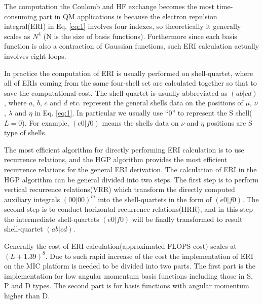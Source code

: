 \documentclass[num-refs]{wiley-article}
\begin{document}
The computation the Coulomb and HF exchange becomes the most time-consuming
part in QM applications is because the electron repulsion integral(ERI) in Eq.
\ref{eq:1} involves four indexes, so theoretically it generally scales as
$N^{4}$ (N is the size of basis functions).  Furthermore since each basis
function is also a contraction of Gaussian functions, such ERI calculation
actually involves eight loops. 

In practice the computation of ERI is usually performed on shell-quartet,
where all of ERIs coming from the same four-shell set are calculated together
so that to save the computational cost. The shell-quartet is usually abbreviated 
as $(ab|cd)$, where $a$, $b$, $c$ and $d$ etc. represent the general shells data on
the positions of $\mu$, $\nu$, $\lambda$ and $\eta$ in Eq. \ref{eq:1}.
In particular we usually use ``0'' to represent the S shell($L=0$). For example,
$(e0|f0)$ means the shells data on $\nu$ and $\eta$ positions are S type of shells.

The most efficient algorithm for directly performing ERI calculation is to use
recurrence relations\cite{gill1994molecular}, and the HGP algorithm\cite{HGP}
provides the most efficient recurrence relations for the general ERI
derivation.  The calculation of ERI in the HGP algorithm can be general divided
into two steps.  The first step is to perform vertical recurrence
relations(VRR) which transform the directly computed auxiliary integrals
$(00|00)^{m}$ into the shell-quartets in the form of $(e0|f0)$.  The second step is
to conduct horizontal recurrence relations(HRR), and in this step the intermediate
shell-quartets $(e0|f0)$ will be finally transformed to result shell-quartet
$(ab|cd)$.

Generally the cost of ERI calculation(approximated FLOPS cost) scales at
$(L+1.39)^{8}$\cite{shao2000improved}.  Due to such rapid increase of the cost
the implementation of ERI on the MIC platform is needed to be divided into two
parts. The first part is the implementation for low angular momentum basis
functions including those in S, P and D types.  The second part is for basis
functions with angular momentum higher than D.



%
%
%
%
%
%
\end{document}
